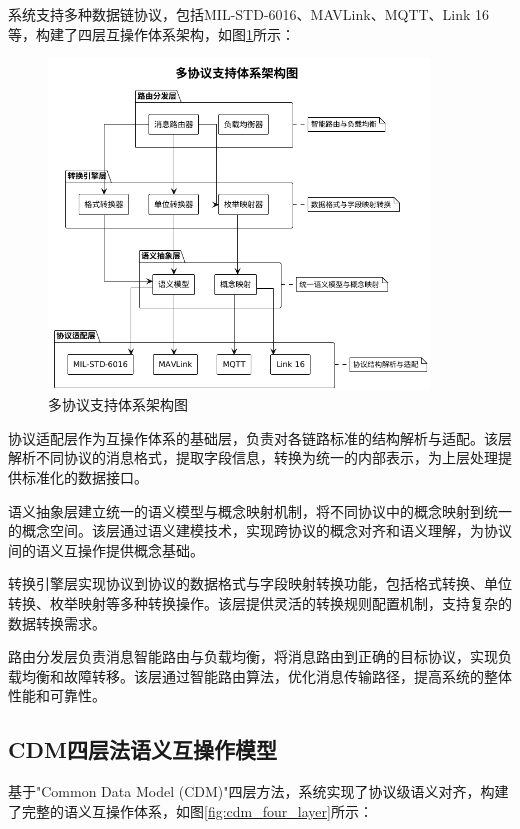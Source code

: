 系统支持多种数据链协议，包括MIL-STD-6016、MAVLink、MQTT、Link 16等，构建了四层互操作体系架构，如图\ref{fig:multi_protocol_support}所示：

\begin{figure}[H]
    \centering
    \includegraphics[width=0.9\textwidth]{chapters/fig-0/multi_protocol_support_simple.png}
    \caption{多协议支持体系架构图}
    \label{fig:multi_protocol_support}
\end{figure}

协议适配层作为互操作体系的基础层，负责对各链路标准的结构解析与适配。该层解析不同协议的消息格式，提取字段信息，转换为统一的内部表示，为上层处理提供标准化的数据接口。

语义抽象层建立统一的语义模型与概念映射机制，将不同协议中的概念映射到统一的概念空间。该层通过语义建模技术，实现跨协议的概念对齐和语义理解，为协议间的语义互操作提供概念基础。

转换引擎层实现协议到协议的数据格式与字段映射转换功能，包括格式转换、单位转换、枚举映射等多种转换操作。该层提供灵活的转换规则配置机制，支持复杂的数据转换需求。

路由分发层负责消息智能路由与负载均衡，将消息路由到正确的目标协议，实现负载均衡和故障转移。该层通过智能路由算法，优化消息传输路径，提高系统的整体性能和可靠性。

\subsection{CDM四层法语义互操作模型}

基于"Common Data Model (CDM)"四层方法，系统实现了协议级语义对齐，构建了完整的语义互操作体系，如图\ref{fig:cdm_four_layer}所示：

